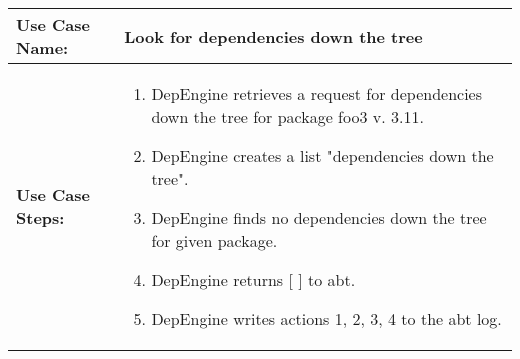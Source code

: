\newpage
\begin{tabularx}{\linewidth}{|l|X|}
\hline
\textbf{Use Case Name:} & \textbf{Look for dependencies down the tree} \\
\hline
\textbf{Use Case Steps:} & 
\begin{minipage}{\linewidth} 
 \vspace{0.05em}
  \begin{enumerate}
   \item DepEngine retrieves a request for dependencies down the tree for package foo3 v. 3.11.
   \item DepEngine creates a list "dependencies down the tree".
   \item DepEngine finds no dependencies down the tree for given package.   
   \item DepEngine returns [ ] to abt.
   \item DepEngine writes actions 1, 2, 3, 4 to the abt log.
  \end{enumerate}
 \vspace{0.05em}
\end{minipage}
\\
\hline 
\end{tabularx}
